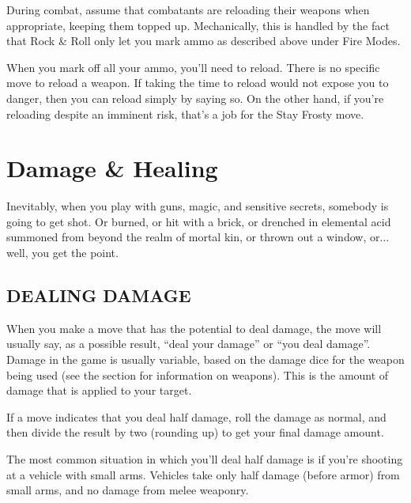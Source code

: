 During combat, assume that combatants are reloading their weapons when appropriate, keeping them topped up. Mechanically, this is handled by the fact that Rock \& Roll only let you mark ammo as described above under Fire Modes.

When you mark off all your ammo, you’ll need to reload. There is no specific move to reload a weapon. If taking the time to reload would not expose you to danger, then you can reload simply by saying so. On the other hand, if you’re reloading despite an imminent risk, that’s a job for the Stay Frosty move.



\section{Damage \& Healing}

Inevitably, when you play with guns, magic, and sensitive secrets, somebody is going to get shot. Or burned, or hit with a brick, or drenched in elemental acid summoned from beyond the realm of mortal kin, or thrown out a window, or... well, you get the point.


\subsection*{DEALING DAMAGE}
When you make a move that has the potential to deal damage, the move will usually say, as a possible result, ``deal your damage'' or ``you deal damage''. Damage in the game is usually variable, based on the damage dice for the weapon being used (see the  section for information on weapons). This is the amount of damage that is applied to your target.


If a move indicates that you deal half damage, roll the damage as normal, and then divide the result by two (rounding up) to get your final damage amount.

The most common situation in which you’ll deal half damage is if you’re shooting at a vehicle with small arms. Vehicles take only half damage (before armor) from small arms, and no damage from melee weaponry.



